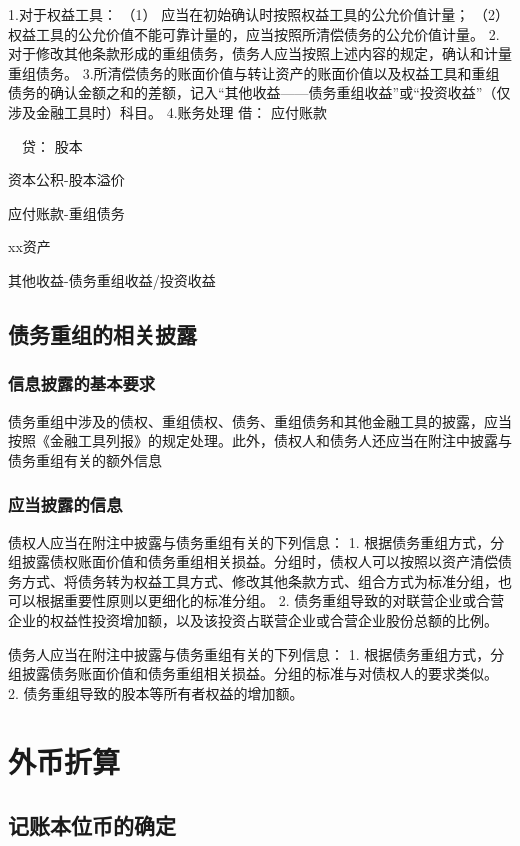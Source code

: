 \documentclass[UTF8,12pt]{ctexart}
\newenvironment{Dr}{\noindent 借：}{\par}
\newenvironment{Cr}{\noindent \ \ 贷：}{\par}
\numberwithin{equation}{section} %
\numberwithin{figure}{section}
\numberwithin{table}{section}
\begin{document}
	1.对于权益工具：
	（1）	应当在初始确认时按照权益工具的公允价值计量；
	（2）	权益工具的公允价值不能可靠计量的，应当按照所清偿债务的公允价值计量。  2.对于修改其他条款形成的重组债务，债务人应当按照上述内容的规定，确认和计量重组债务。
	3.所清偿债务的账面价值与转让资产的账面价值以及权益工具和重组债务的确认金额之和的差额，记入“其他收益——债务重组收益”或“投资收益”（仅涉及金融工具时）科目。
	4.账务处理
	\begin{Dr}
		应付账款
	\end{Dr}
	\begin{Cr}
		股本
		
		资本公积-股本溢价
		
		应付账款-重组债务
		
		xx资产
		
		其他收益-债务重组收益/投资收益
	\end{Cr}
	
	\subsection{债务重组的相关披露}
	\subsubsection{信息披露的基本要求}
	债务重组中涉及的债权、重组债权、债务、重组债务和其他金融工具的披露，应当按照《金融工具列报》的规定处理。此外，债权人和债务人还应当在附注中披露与债务重组有关的额外信息
	
	\subsubsection{应当披露的信息}
	债权人应当在附注中披露与债务重组有关的下列信息：
	1.	根据债务重组方式，分组披露债权账面价值和债务重组相关损益。分组时，债权人可以按照以资产清偿债务方式、将债务转为权益工具方式、修改其他条款方式、组合方式为标准分组，也可以根据重要性原则以更细化的标准分组。
	2.	债务重组导致的对联营企业或合营企业的权益性投资增加额，以及该投资占联营企业或合营企业股份总额的比例。
	
	债务人应当在附注中披露与债务重组有关的下列信息：
	1.	根据债务重组方式，分组披露债务账面价值和债务重组相关损益。分组的标准与对债权人的要求类似。
	2.	债务重组导致的股本等所有者权益的增加额。
	
	
	
	\newpage
	\section{外币折算}
	\subsection{记账本位币的确定}
\end{document}
